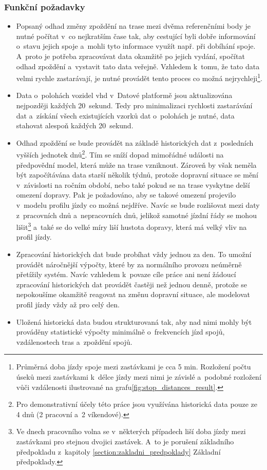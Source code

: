 \subsubsection{Funkční požadavky}


\begin{itemize}
\item
Popsaný odhad změny zpoždění na trase mezi dvěma referenčními body je nutné počítat v~co nejkratším čase tak, aby cestující byli dobře informování o~stavu jejich spoje a~mohli tyto informace využít např. při dobíhání spoje. A~proto je potřeba zpracovávat data okamžitě po jejich vydání, spočítat odhad zpoždění a~vystavit tato data veřejně. Vzhledem k~tomu, že tato data velmi rychle zastarávají, je nutné provádět tento proces co možná nejrychleji\footnote{Průměrná doba jízdy spoje mezi zastávkami je cca 5 min. Rozložení počtu úseků mezi zastávkami k~délce jízdy mezi nimi je závislé a~podobné rozložení vůči vzdálenosti ilustrované na grafu\ref{fig:stop_distances_result}.}.


\item
Data o~polohách vozidel \gls{vhd} v~Datové platformě jsou aktualizována nejpozději každých 20~sekund. Tedy pro minimalizaci rychlosti zastarávání dat a~získání všech existujících vzorků dat o~polohách je nutné, data stahovat alespoň každých 20~sekund.


\item
Odhad zpoždění se bude provádět na základě historických dat z~posledních vyšších jednotek dnů\footnote{Pro demonstrativní účely této práce jsou využívána historická data pouze ze 4 dnů (2 pracovní a~2 víkendové).}. Tím se sníží dopad mimořádné události na předpovědní model, která může na trase vzniknout. Zároveň by však neměla být započítávána data starší několik týdnů, protože dopravní situace se mění v~závislosti na ročním období, nebo také pokud se na trase vyskytne delší omezení dopravy. Pak je požadováno, aby se takové omezení projevilo v~modelu profilu jízdy co možná nejdříve. Navíc se bude rozlišovat mezi daty z~pracovních dnů a~nepracovních dnů, jelikož samotné jízdní řády se mohou lišit\footnote{Ve dnech pracovního volna se v~některých případech liší doba jízdy mezi zastávkami pro stejnou dvojici zastávek. A~to je porušení základního předpokladu z~kapitoly \ref{section:zakladni_predpoklady} Základní předpoklady.} a~také se do velké míry liší hustota dopravy, která má velký vliv na profil jízdy.


\item
Zpracování historických dat bude probíhat vždy jednou za den. To umožní provádět náročnější výpočty, které by za normálního provozu neúměrně přetížily systém. Navíc vzhledem k~povaze cíle práce ani není žádoucí zpracování historických dat provádět častěji než jednou denně, protože se nepokoušíme okamžitě reagovat na změnu dopravní situace, ale modelovat profil jízdy vždy až pro celý den.

\item
Uložená historická data budou strukturovaná tak, aby nad nimi mohly být prováděny statistické výpočty minimálně o~frekvencích jízd spojů, vzdálenostech tras a~zpoždění spojů.
\end{itemize}


